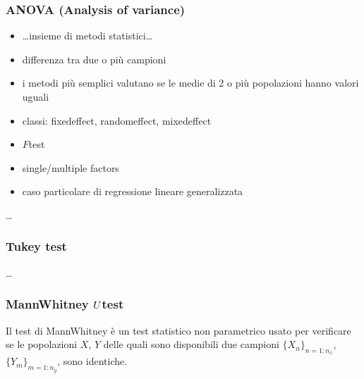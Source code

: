 \documentclass[letterpaper,10pt,italian]{jupyterBook}
\begin{document}
\subsubsection{ANOVA (Analysis of variance)}
\label{\detokenize{ch/statistics/hp-test-independence:anova-analysis-of-variance}}\label{\detokenize{ch/statistics/hp-test-independence:hp-test-independence-anova}}\begin{itemize}
\item {} 
\sphinxAtStartPar
…insieme di metodi statistici…

\item {} 
\sphinxAtStartPar
differenza tra due o più campioni

\item {} 
\sphinxAtStartPar
i metodi più semplici valutano se le medie di 2 o più popolazioni hanno valori uguali

\item {} 
 classi: fixed\sphinxhyphen{}effect, random\sphinxhyphen{}effect, mixed\sphinxhyphen{}effect

\item {} 
\sphinxAtStartPar
\(F\)\sphinxhyphen{}test

\item {} 
\sphinxAtStartPar
single/multiple factors

\item {} 
\sphinxAtStartPar
caso particolare di regressione lineare generalizzata

\end{itemize}

\sphinxAtStartPar
…


\subsubsection{Tukey test}
\label{\detokenize{ch/statistics/hp-test-independence:tukey-test}}\label{\detokenize{ch/statistics/hp-test-independence:hp-test-independence-tukey}}
\sphinxAtStartPar
…


\subsubsection{Mann\sphinxhyphen{}Whitney \protect\(U\protect\)\sphinxhyphen{}test}
\label{\detokenize{ch/statistics/hp-test-independence:mann-whitney-u-test}}\label{\detokenize{ch/statistics/hp-test-independence:hp-test-independence-mann-whitney}}
\sphinxAtStartPar
Il test di Mann\sphinxhyphen{}Whitney è un test statistico non parametrico usato per verificare se le popolazioni \(X\), \(Y\) delle quali sono disponibili due campioni \(\{X_n\}_{n=1:n_x}\), \(\{Y_m\}_{m=1:n_y}\), sono identiche.
\end{document}
